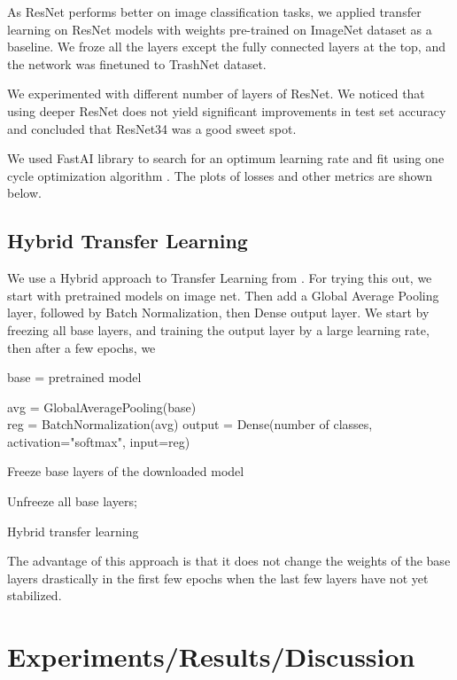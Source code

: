\documentclass{article}
\begin{document}
As ResNet \cite{he2016deep} performs better on image classification tasks, we applied transfer learning on ResNet models with weights pre-trained on ImageNet dataset as a baseline. We froze all the layers except the fully connected layers at the top, and the network was finetuned to TrashNet dataset. 

We experimented with different number of layers of ResNet. We noticed that using deeper ResNet does not yield significant improvements in test set accuracy and concluded that ResNet34 was a good sweet spot. 

We used FastAI \cite{howard2018fastai} library to search for an optimum learning rate and fit using one cycle optimization algorithm \cite{1CyclePolicy}. The plots of losses and other metrics are shown below. 

\subsection{Hybrid Transfer Learning}
We use a Hybrid approach to Transfer Learning from \cite{geron2019hands}. For trying this out, we start with pretrained models on image net. Then add a Global Average Pooling layer, followed by Batch Normalization, then Dense output layer. We start by freezing all base layers, and training the output layer by a large learning rate, then after a few epochs, we 

\begin{algorithm}[H]
\SetAlgoLined
{}
 base =  pretrained model \;
 
 avg = GlobalAveragePooling(base) \\
 reg = BatchNormalization(avg)
 output = Dense(number of classes, activation="softmax", input=reg)

 Freeze base layers of the downloaded model\;

 
 Unfreeze all base layers; 
 
 \caption{Hybrid transfer learning}
\end{algorithm}

The advantage of this approach is that it does not change the weights of the base layers drastically in the first few epochs when the last few layers have not yet stabilized. 

\section{Experiments/Results/Discussion}
\end{document}
